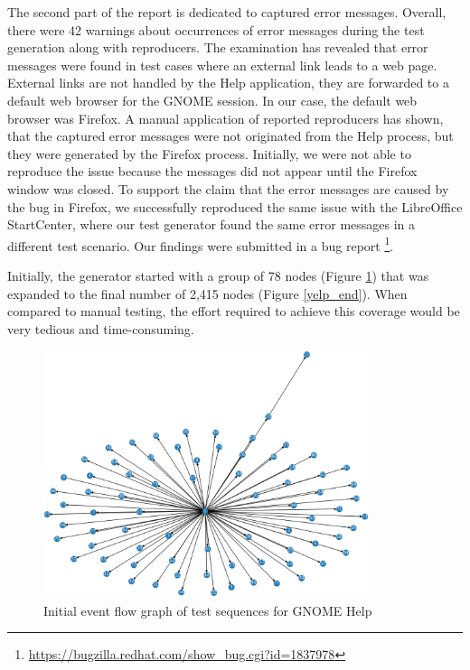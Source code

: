 The second part of the report is dedicated to captured error messages. Overall, there were 42 warnings about occurrences of error messages during the test generation along with reproducers. The examination has revealed that error messages were found in test cases where an external link leads to a web page. External links are not handled by the Help application, they are forwarded to a default web browser for the GNOME session. In our case, the default web browser was Firefox. A manual application of reported reproducers has shown, that the captured error messages were not originated from the Help process, but they were generated by the Firefox process. Initially, we were not able to reproduce the issue because the messages did not appear until the Firefox window was closed. To support the claim that the error messages are caused by the bug in Firefox, we successfully reproduced the same issue with the LibreOffice StartCenter, where our test generator found the same error messages in a different test scenario. Our findings were submitted in a bug report \footnote{\url{https://bugzilla.redhat.com/show_bug.cgi?id=1837978}}. 

Initially, the generator started with a group of 78 nodes (Figure \ref{yelp_start}) that was expanded to the final number of 2,415 nodes (Figure \ref{yelp_end}). When compared to manual testing, the effort required to achieve this coverage would be very tedious and time-consuming. 

\begin{figure}[H]
	\centering
	\includegraphics[width=0.85\textwidth,clip]{obrazky-figures/yelp_n_start.png}
	\caption{Initial event flow graph of test sequences for GNOME Help}
	\label{yelp_start}
\end{figure}

